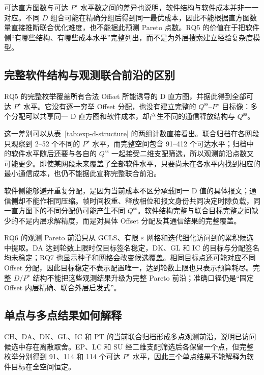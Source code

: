 \documentclass[UTF8,a4paper,twoside,zihao=-4]{ctexart}
\numberwithin{equation}{section}
\numberwithin{figure}{section}
\numberwithin{table}{section}
\theoremstyle{definition}
\numberwithin{algocf}{section}
\begin{document}
可达直方图数与可达 $P^\star$ 水平数之间的差异也说明，软件结构与软件成本并非一一对应。不同 $D$ 组合可能在精确分组后得到同一最优成本，因此不能根据直方图数量直接推断联合优化难度，也不能据此预测 Pareto 点数。RQ5 的价值在于把软件侧“有哪些结构、有哪些成本水平”完整列出，而不是为外层搜索建立经验复杂度模型。

\subsection{完整软件结构与观测联合前沿的区别}
\label{subsec:discussion-structure-front}

RQ5 的完整枚举覆盖所有合法 Offset 所能诱导的 D 直方图，并据此得到全部可达 $P^\star$ 水平。它没有逐一穷举 Offset 分配，也没有建立完整的 $Q^{\mathrm{ss}}$--$P^\star$ 目标像：多个分配可以共享同一 D 直方图和软件成本，却产生不同的通信释放结构与 $Q^{\mathrm{ss}}$。

这一差别可以从表~\ref{tab:exp-d-structure} 的两组计数直接看出。联合归档在各网段只观察到 2--52 个不同的 $P^\star$ 水平，而完整空间包含 91--412 个可达水平；归档中的软件水平随后还要与各自的 $Q^{\mathrm{ss}}$ 一起接受二维支配筛选，所以观测前沿点数又可能更少。即使某网段未来覆盖了全部软件水平，只要尚未在各水平内找到相应的最小通信成本，也仍不能据此宣称完整联合前沿。

软件侧能够避开重复分配，是因为当前成本不区分承载同一 D 值的具体报文；通信侧却不能作相同压缩。帧时间权重、释放相位和报文身份共同决定时隙负载，同一直方图下的不同分配仍可能产生不同 $Q^{\mathrm{ss}}$。软件结构完整与联合目标完整之间缺少的不是内层求解精度，而是对具体 Offset 分配及其通信结果的完整覆盖。

RQ6 的观测 Pareto 前沿只从 GCLS、有限 $\varepsilon$ 网格和迭代细化访问到的累积候选中提取。DA 达到轮数上限时仅目标签名稳定，DK、GL 和 IC 的目标与分配签名均未稳定；RQ7 也显示种子和网格会改变候选覆盖。相同目标点还可能对应不同 Offset 分配，因此目标稳定不表示配置唯一，达到轮数上限也只表示预算耗尽。完整 $D/P^\star$ 结构不能把这些观测结果升级为完整 Pareto 前沿；准确口径仍是“固定 Offset 内层精确、联合外层启发式”。

\subsection{单点与多点结果如何解释}
\label{subsec:discussion-single-multi}

CH、DA、DK、GL、IC 和 PT 的当前联合归档形成多点观测前沿，说明已访问候选中存在离散取舍。EP、LC 和 SU 经二维支配筛选后各保留一个点，但完整枚举分别得到 91、114 和 114 个可达 $P^\star$ 水平，因此三个单点结果不能解释为软件目标在全空间恒定。
\end{document}
